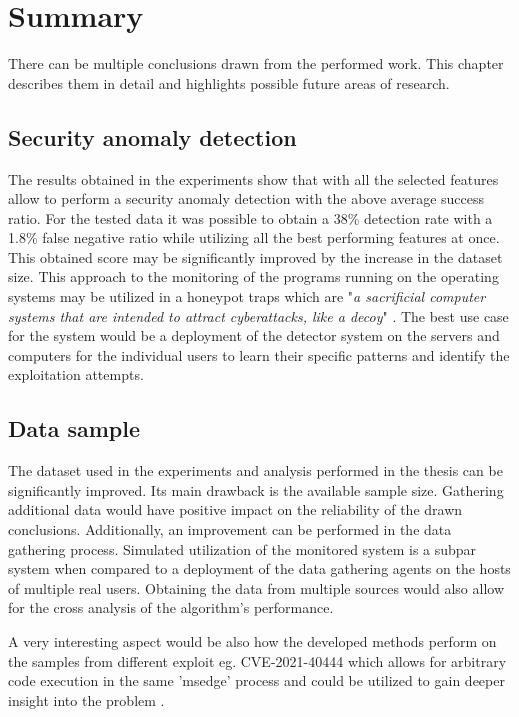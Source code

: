 \documentclass[a4paper,twoside,12pt]{book}
\begin{document}
\chapter{Summary}

There can be multiple conclusions drawn from the performed work. This chapter describes them in 
detail and highlights possible future areas of research.

\section{Security anomaly detection}

The results obtained in the experiments show that with all the selected features allow 
to perform a security anomaly detection with the above average success ratio. For the tested
data it was possible to obtain a 38\% detection rate with a 1.8\% false negative ratio while
utilizing all the best performing features at once. This obtained score may be significantly 
improved by the increase in the dataset size. This approach to the monitoring of the programs 
running on the operating systems may be utilized in a honeypot traps which are "\textit{a sacrificial 
computer systems that are intended to attract cyberattacks, like a decoy}" \cite{bib:Honeypot}. 
The best use case for the system would be a deployment of the detector system on the servers and 
computers for the individual users to learn their specific patterns and identify the exploitation
attempts.

\section{Data sample}

The dataset used in the experiments and analysis performed in the thesis can be significantly 
improved. Its main drawback is the available sample size. Gathering additional data would have
positive impact on the reliability of the drawn conclusions. Additionally, an improvement 
can be performed in the data gathering process. Simulated utilization of the monitored system
is a subpar system when compared to a deployment of the data gathering agents on the hosts of 
multiple real users. Obtaining the data from multiple sources would also allow for the cross
analysis of the algorithm's performance. 

A very interesting aspect would be also how the developed methods perform on the samples from 
different exploit eg. CVE-2021-40444 which allows for arbitrary code execution in the same 'msedge'
process and could be utilized to gain deeper insight into the problem \cite{bib:newEdgeExploit}.
\end{document}
